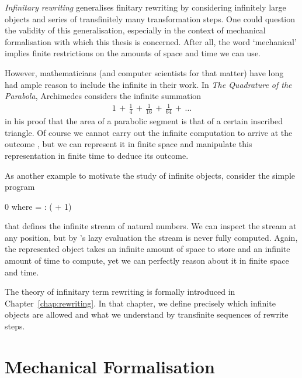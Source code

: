 \emph{Infinitary rewriting} generalises finitary rewriting by
considering infinitely large objects and series of transfinitely many
transformation steps. One could question the validity of this
generalisation, especially in the context of mechanical formalisation
with which this thesis is concerned. After all, the word `mechanical'
implies finite restrictions on the amounts of space and time we can
use.

However, mathematicians (and computer scientists for that matter) have
long had ample reason to include the infinite in their work. In
\emph{The Quadrature of the Parabola}, Archimedes considers the
infinite summation
\begin{align*}
  1 \,+\, \frac{1}{4} \,+\, \frac{1}{16} \,+\, \frac{1}{64} \,+\, \ldots
\end{align*}
in his proof that the area of a parabolic segment is  that
of a certain inscribed triangle. Of course we cannot carry out the
infinite computation to arrive at the outcome , but we can
represent it in finite space and manipulate this representation in
finite time to deduce its outcome.

As another example to motivate the study of infinite objects, consider
the simple \Haskell program
\begin{singlespace}
\begin{coqdoccode}
\coqdocnoindent
{} 0 \coqdocindent{0.2em} \textsf{where}
\coqdocindent{0.2em}   =
 : 
( + 1)\coqdoceol
\end{coqdoccode}
\end{singlespace}
that defines the infinite stream of natural numbers. We can inspect
the stream at any position, but by \Haskell's lazy evaluation the
stream is never fully computed. Again, the represented object takes an
infinite amount of space to store and an infinite amount of time to
compute, yet we can perfectly reason about it in finite space and
time.

The theory of infinitary term rewriting is formally introduced in
Chapter~\ref{chap:rewriting}. In that chapter, we define precisely
which infinite objects are allowed and what we understand by
transfinite sequences of rewrite steps.


\section*{Mechanical Formalisation}

